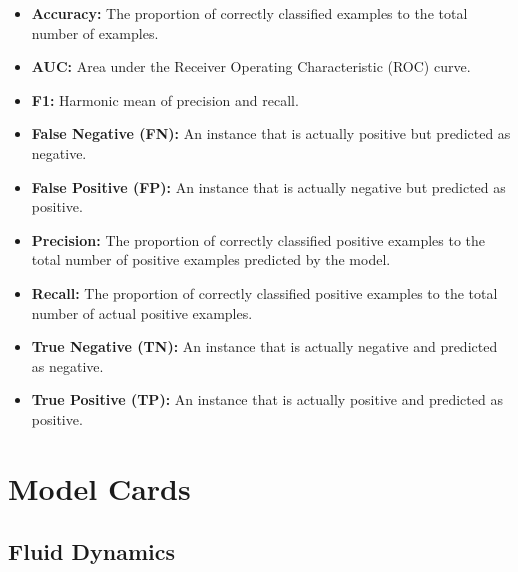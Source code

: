 \begin{itemize}
    \item \textbf{Accuracy:} The proportion of correctly classified examples to the total number of examples.
    \item \textbf{AUC:} Area under the Receiver Operating Characteristic (ROC) curve.
    \item \textbf{F1:} Harmonic mean of precision and recall.
    \item \textbf{False Negative (FN):} An instance that is actually positive but predicted as negative.
    \item \textbf{False Positive (FP):} An instance that is actually negative but predicted as positive.
    \item \textbf{Precision:} The proportion of correctly classified positive examples to the total number of positive examples predicted by the model.
    \item \textbf{Recall:} The proportion of correctly classified positive examples to the total number of actual positive examples.
    \item \textbf{True Negative (TN):} An instance that is actually negative and predicted as negative.
    \item \textbf{True Positive (TP):} An instance that is actually positive and predicted as positive.
\end{itemize}

\section{Model Cards}

\subsection{Fluid Dynamics}

